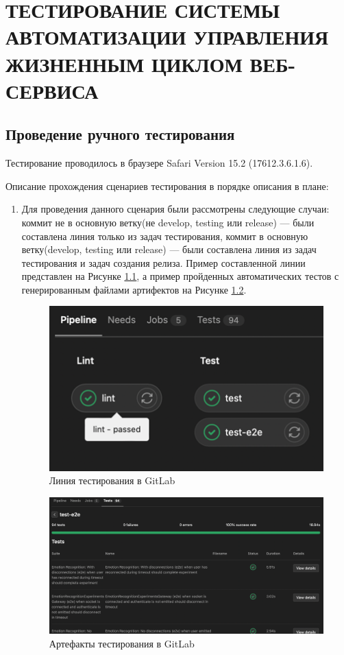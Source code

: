 \chapter{ТЕСТИРОВАНИЕ СИСТЕМЫ АВТОМАТИЗАЦИИ УПРАВЛЕНИЯ ЖИЗНЕННЫМ ЦИКЛОМ ВЕБ-СЕРВИСА}
\label{cha:research}

\section{Проведение ручного тестирования}

Тестирование проводилось в браузере Safari Version 15.2 (17612.3.6.1.6).

Описание прохождения сценариев тестирования в порядке описания в плане:

\begin{enumerate}
    \item Для проведения данного сценария были рассмотрены следующие случаи:
    коммит не в основную ветку(не develop, testing или release) --- были составлена линия только из задач тестирования,
    коммит в основную ветку(develop, testing или release) --- были составлена линия из задач тестирования и задач создания релиза.
    Пример составленной линии представлен на Рисунке \ref{fig:qa-pipeline}, а пример пройденных автоматических тестов
    с генерированным файлами артифектов на Рисунке \ref{fig:qa-artifacts}.

    \begin{figure}[ht]
        \centering
        \includegraphics[scale=0.8]{figures/2}
        \caption{Линия тестирования в GitLab}
        \label{fig:qa-pipeline}
    \end{figure}

    \begin{figure}[ht]
        \centering
        \includegraphics[scale=0.4]{figures/3}
        \caption{Артефакты тестирования в GitLab}
        \label{fig:qa-artifacts}
    \end{figure}


\end{enumerate}
